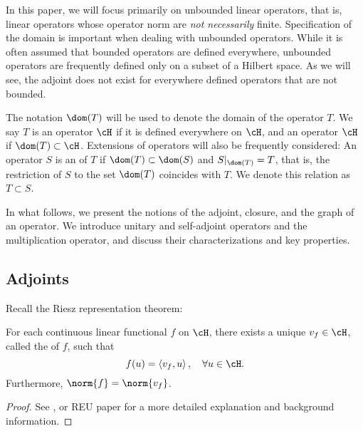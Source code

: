 \documentclass[oneside,reqno,letterpaper]{amsart}
\begin{document}
In this paper, we will focus primarily on unbounded linear operators, that is, linear operators whose operator norm are \textit{not necessarily} finite. 
Specification of the domain is important when dealing with unbounded operators. 
While it is often assumed that bounded operators are defined everywhere, unbounded operators are frequently defined only on a subset of a Hilbert space.
As we will see, the adjoint does not exist for everywhere defined operators that are not bounded. 

The notation \(\dom(T)\) will be used to denote the domain of the operator \(T\). 
We say \(T\) is an operator  \(\cH\) if it is defined everywhere on \(\cH\), and an operator  \(\cH\) if \(\dom(T) \subset \cH\). 
Extensions of operators will also be frequently considered: 
An operator \(S\) is an  of \(T\) if \(\dom(T) \subset \dom(S)\) and \(S|_{\dom(T)} = T\), that is, the restriction of \(S\) to the set \(\dom(T)\) coincides with \(T\). 
We denote this relation as \(T \subset S\). 

In what follows, we present the notions of the adjoint, closure, and the graph of an operator. 
We introduce unitary and self-adjoint operators and the multiplication operator, and discuss their characterizations and key properties.  


\subsection{Adjoints}

Recall the Riesz representation theorem:
\begin{theorem}
\label{thm:riesz-representation}
  For each continuous linear functional \(f\) on \(\cH\), there exists a unique \(v_f \in \cH\), called the  of \(f\), such that \[
    f(u) = \left< v_f, u \right>, \quad \forall  u \in \cH . 
  \] 
  Furthermore, \(\norm{f} = \norm{v_f}\). 
\end{theorem}
\begin{proof}
  See \cite[p.~135]{brezis2011functional}, or REU paper \cite{adler2021hilbert} for a more detailed explanation and background information. 
\end{proof}
\end{document}
